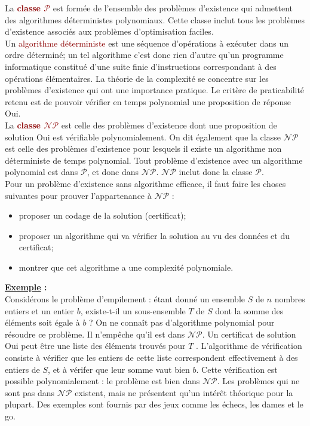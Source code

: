 \documentclass{article}
\newcommand{\dred}[1]{\textcolor{darkred}{\textbf{#1}}}
\newcommand{\red}[1]{\textcolor{darkred}{#1}}
\begin{document}
La \dred{classe $\mathcal{P}$} est formée de l’ensemble des problèmes d’existence qui admettent des algorithmes déterministes 
polynomiaux. Cette classe inclut tous les problèmes d’existence associés aux problèmes d’optimisation faciles. \\
Un \red{algorithme déterministe} est une séquence d’opérations à exécuter dans un ordre déterminé; un tel algorithme c’est donc rien d’autre qu’un programme informatique 
constitué d’une suite finie d’instructions correspondant à des opérations élémentaires.
La théorie de la complexité se concentre sur les problèmes d’existence qui ont une importance pratique. Le critère de praticabilité retenu est de pouvoir vérifier en temps 
polynomial une proposition de réponse Oui. \\
La \dred{classe $\mathcal{N}\mathcal{P}$} est celle des problèmes d’existence dont une proposition de solution Oui est vérifiable polynomialement. On dit également que la 
classe $\mathcal{N}\mathcal{P}$ est celle des problèmes d’existence pour lesquels il existe un algorithme non déterministe de temps polynomial. Tout problème d’existence avec 
un algorithme polynomial est dans $\mathcal{P}$, et donc dans $\mathcal{N}\mathcal{P}$. $\mathcal{N}\mathcal{P}$ inclut donc la classe $\mathcal{P}$. \\
Pour un problème d’existence sans algorithme efficace, il faut faire les choses suivantes pour prouver l’appartenance à $\mathcal{N}\mathcal{P}$ :
\begin{itemize}
\item proposer un codage de la solution (certificat);
\item proposer un algorithme qui va vérifier la solution au vu des données et du certificat;
\item montrer que cet algorithme a une complexité polynomiale. \\
\end{itemize}

\textbf{\underline{Exemple} :} \\

Considérons le problème d’empilement : étant donné un ensemble $S$ de $n$ nombres entiers et un entier $b$, existe-t-il un sous-ensemble $T$ de $S$ dont la somme des 
éléments soit égale à $b$ ? On ne connaît pas d’algorithme polynomial pour résoudre ce problème. Il n’empêche qu’il est dans $\mathcal{N}\mathcal{P}$. Un certificat de solution 
Oui peut être une liste des éléments trouvés pour $T$ . L’algorithme de vérification consiste à vérifier que les entiers de cette liste correspondent effectivement à des entiers de 
$S$, et à vérifer que leur somme vaut bien $b$. Cette vérification est possible polynomialement : le problème est bien dans $\mathcal{N}\mathcal{P}$. Les problèmes qui ne sont 
pas dans $\mathcal{N}\mathcal{P}$ existent, mais ne présentent qu’un intérêt théorique pour la plupart. Des exemples sont fournis par des jeux comme les échecs, les dames et le 
go.
\end{document}
